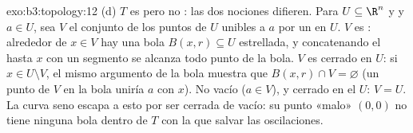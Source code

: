 \begin{solution}{exo:b3:topology:12}
(d) $T$ es  pero no
: las dos
nociones difieren. Para $U \subseteq \R^n$  y
 y $a \in U$, sea $V$ el
conjunto de los puntos de $U$ unibles a $a$ por un
 en $U$. $V$ es :
alrededor de $x \in V$ hay una bola $B(x, r)
\subseteq U$ estrellada, y concatenando el
 hasta $x$ con un segmento
se alcanza todo punto de la bola. $V$ es cerrado en $U$: si
$x \in U \setminus V$, el mismo argumento de la bola muestra que
$B(x, r) \cap V = \varnothing$ (un punto de $V$ en la bola uniría $a$
con $x$). No vacío ($a \in
V$),  y cerrado en el 
$U$: $V = U$. La curva seno escapa a esto por ser cerrada de
 vacío: su punto «malo»
$(0,0)$ no tiene ninguna bola dentro de $T$ con la que salvar las
oscilaciones.
\end{solution}

